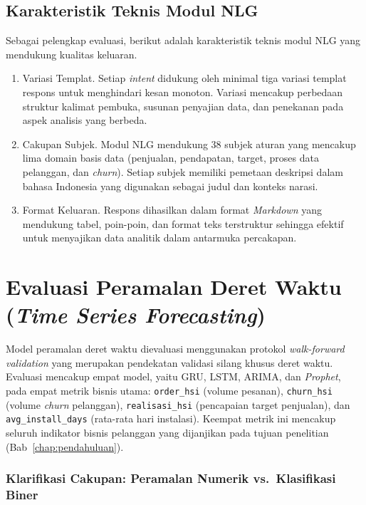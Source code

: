 \subsection{Karakteristik Teknis Modul NLG}

Sebagai pelengkap evaluasi, berikut adalah karakteristik teknis modul NLG yang mendukung kualitas keluaran.

\begin{enumerate}
    \item Variasi Templat. Setiap \textit{intent} didukung oleh minimal tiga variasi templat respons untuk menghindari kesan monoton. Variasi mencakup perbedaan struktur kalimat pembuka, susunan penyajian data, dan penekanan pada aspek analisis yang berbeda.

    \item Cakupan Subjek. Modul NLG mendukung 38 subjek aturan yang mencakup lima domain basis data (penjualan, pendapatan, target, proses data pelanggan, dan \textit{churn}). Setiap subjek memiliki pemetaan deskripsi dalam bahasa Indonesia yang digunakan sebagai judul dan konteks narasi.

    \item Format Keluaran. Respons dihasilkan dalam format \textit{Markdown} yang mendukung tabel, poin-poin, dan format teks terstruktur sehingga efektif untuk menyajikan data analitik dalam antarmuka percakapan.
\end{enumerate}

\section{Evaluasi Peramalan Deret Waktu (\textit{Time Series Forecasting})}
\label{sec:eval-forecasting}

Model peramalan deret waktu dievaluasi menggunakan protokol \textit{walk-forward va\-li\-da\-tion} yang merupakan pendekatan validasi silang khusus deret waktu. Evaluasi mencakup empat model, yaitu GRU, LSTM, ARIMA, dan \textit{Prophet}, pada empat metrik bisnis utama: \texttt{order\_}\allowbreak\texttt{hsi} (volume pesanan), \texttt{churn\_}\allowbreak\texttt{hsi} (volume \textit{churn} pelanggan), \texttt{realisasi\_}\allowbreak\texttt{hsi} (pencapaian target penjualan), dan \texttt{avg\_}\allowbreak\texttt{install\_}\allowbreak\texttt{days} (rata-rata hari instalasi). Keempat metrik ini mencakup seluruh indikator bisnis pelanggan yang dijanjikan pada tujuan penelitian (Bab~\ref{chap:pendahuluan}).

\subsubsection*{Klarifikasi Cakupan: Peramalan Numerik vs.\ Klasifikasi Biner}

